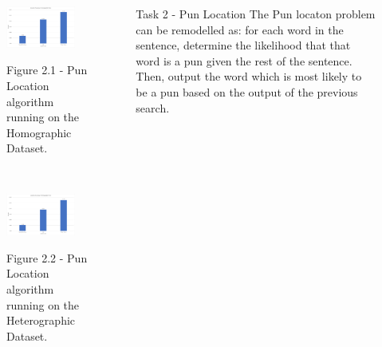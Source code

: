 \documentclass[final]{beamer}
\newlength{\onecolwid}
\newlength{\twocolwid}
\begin{document}
\begin{frame}[t]
\begin{columns}[t]
\begin{column}{\twocolwid}
\begin{columns}[t,totalwidth=\twocolwid]
\begin{column}{\onecolwid}
					\begin{figure}
					\includegraphics[width=0.85\textwidth]{HomographicLocation.png}\\
					\caption{Figure 2.1 - Pun Location algorithm running on the Homographic Dataset.}
					\end{figure}
					\\
					\vspace{20mm}
					\begin{figure}
					\includegraphics[width=0.85\textwidth]{HeterographicLocation.png}\\
					\caption{Figure 2.2 - Pun Location algorithm running on the Heterographic Dataset.}
					\end{figure}
				\end{column} %
				\begin{column}{\onecolwid}
					\vspace{20mm}
					\begin{block}{Task 2 - Pun Location}
						{\large 
							The Pun locaton problem can be remodelled as: for each word in the sentence, determine the likelihood that that word is a pun given the rest of the sentence. Then, output the word which is most likely to be a pun based on the output of the previous search. \\
}
\end{block}
\end{column}
\end{columns}
\end{column}
\end{columns}
\end{frame}
\end{document}
